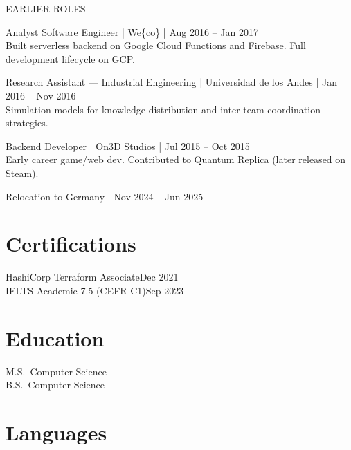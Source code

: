 \documentclass[a4paper,9pt]{extarticle}
\newcommand{\earlierrole}[4]{%
  {\small\mediumfont\color{darktext}#1} {\small\color{graytext}| #2 | #3}\\
  {\small\color{graytext}#4}\par\vspace{0.3em}
}
\begin{document}
\vspace{1em}

{\mediumfont\color{accent}\small EARLIER ROLES}

\earlierrole{Analyst Software Engineer}{We\{co\}}{Aug 2016 -- Jan 2017}{Built serverless backend on Google Cloud Functions and Firebase. Full development lifecycle on GCP.}
\earlierrole{Research Assistant — Industrial Engineering}{Universidad de los Andes}{Jan 2016 -- Nov 2016}{Simulation models for knowledge distribution and inter-team coordination strategies.}
\earlierrole{Backend Developer}{On3D Studios}{Jul 2015 -- Oct 2015}{Early career game/web dev. Contributed to Quantum Replica (later released on Steam).}
{\small\mediumfont\color{darktext}Relocation to Germany} {\small\color{graytext}| Nov 2024 -- Jun 2025}\\


\section{Certifications}

{\mediumfont HashiCorp Terraform Associate}\hfill{\small\color{graytext}Dec 2021}\\
{\mediumfont IELTS Academic 7.5 (CEFR C1)}\hfill{\small\color{graytext}Sep 2023}


\section{Education}

{\mediumfont M.S.\ Computer Science}\\
{\mediumfont B.S.\ Computer Science}


\section{Languages}
\end{document}
